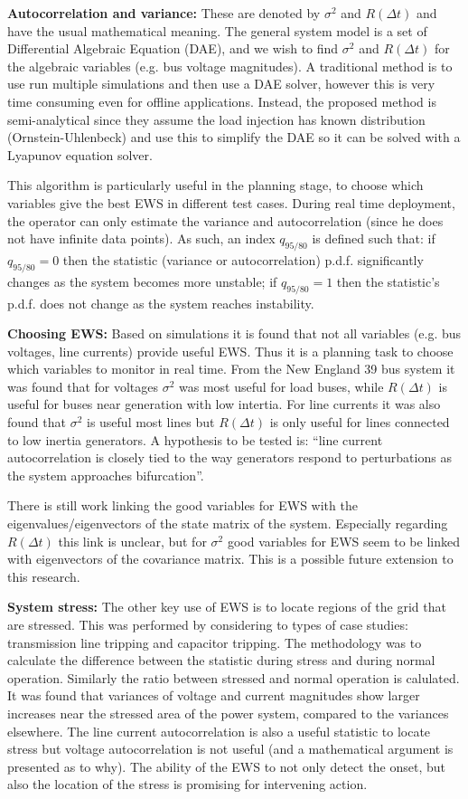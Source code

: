 \documentclass[12pt, a4paper]{report}
\begin{document}
\textbf{Autocorrelation and variance:} These are denoted by $\sigma^2$ and $R(\Delta t)$ and have the usual mathematical meaning. The general system model is a set of Differential Algebraic Equation (DAE), and we wish to find $\sigma^2$ and $R(\Delta t)$ for the algebraic variables (e.g. bus voltage magnitudes). A traditional method is to use run multiple simulations and then use a DAE solver, however this is very time consuming even for offline applications. Instead, the proposed method is semi-analytical since they assume the load injection has known distribution (Ornstein-Uhlenbeck) and use this to simplify the DAE so it can be solved with a Lyapunov equation solver.\par
This algorithm is particularly useful in the planning stage, to choose which variables give the best EWS in different test cases. During real time deployment, the operator can only estimate the variance and autocorrelation (since he does not have infinite data points). As such, an index $q_{95/80}$ is defined such that: if $q_{95/80}=0$ then the statistic (variance or autocorrelation) p.d.f. significantly changes as the system becomes more unstable; if $q_{95/80}=1$ then the statistic's p.d.f. does not change as the system reaches instability.\par
\textbf{Choosing EWS:} Based on simulations it is found that not all variables (e.g. bus voltages, line currents) provide useful EWS. Thus it is a planning task to choose which variables to monitor in real time. From the New England 39 bus system it was found that for voltages $\sigma^2$ was most useful for load buses, while $R(\Delta t)$ is useful for buses near generation with low intertia. For line currents it was also found that $\sigma^2$ is useful most lines but $R(\Delta t)$ is only useful for lines connected to low inertia generators. A hypothesis to be tested is: ``line current autocorrelation is closely tied to the way generators respond to perturbations as the system approaches bifurcation''.\par
There is still work linking the good variables for EWS with the eigenvalues/eigenvectors of the state matrix of the system. Especially regarding $R(\Delta t)$ this link is unclear, but for $\sigma^2$ good variables for EWS seem to be linked with eigenvectors of the covariance matrix. This is a possible future extension to this research.\par
\textbf{System stress:} The other key use of EWS is to locate regions of the grid that are stressed. This was performed by considering to types of case studies: transmission line tripping and capacitor tripping. The methodology was to calculate the difference between the statistic during stress and during normal operation. Similarly the ratio between stressed and normal operation is calulated. It was found that variances of voltage and current magnitudes show larger increases near the stressed area of the power system, compared to the variances elsewhere. The line current autocorrelation is also a useful statistic to locate stress but voltage autocorrelation is not useful (and a mathematical argument is presented as to why). The ability of the EWS to not only detect the onset, but also the location of the stress is promising for intervening action.\par
\end{document}
